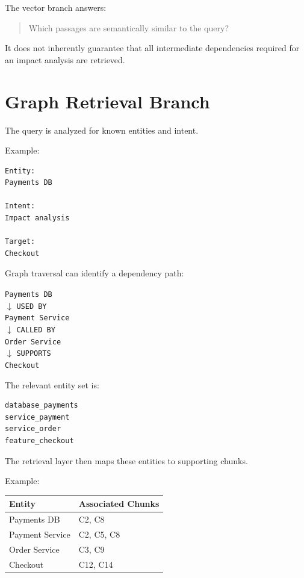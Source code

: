 \documentclass[11pt,a4paper]{article}
\begin{document}
The vector branch answers:

\begin{quote}
Which passages are semantically similar to the query?
\end{quote}

It does not inherently guarantee that all intermediate dependencies required for an impact analysis are retrieved.

\section{Graph Retrieval Branch}

The query is analyzed for known entities and intent.

Example:

\begin{lstlisting}
Entity:
Payments DB

Intent:
Impact analysis

Target:
Checkout
\end{lstlisting}

Graph traversal can identify a dependency path:

\begin{center}
\texttt{Payments DB}\\
$\downarrow$ \texttt{USED BY}\\
\texttt{Payment Service}\\
$\downarrow$ \texttt{CALLED BY}\\
\texttt{Order Service}\\
$\downarrow$ \texttt{SUPPORTS}\\
\texttt{Checkout}
\end{center}

The relevant entity set is:

\begin{lstlisting}
database_payments
service_payment
service_order
feature_checkout
\end{lstlisting}

The retrieval layer then maps these entities to supporting chunks.

Example:

\begin{center}
\begin{tabular}{ll}
\toprule
Entity & Associated Chunks \\
\midrule
Payments DB & C2, C8 \\
Payment Service & C2, C5, C8 \\
Order Service & C3, C9 \\
Checkout & C12, C14 \\
\bottomrule
\end{tabular}
\end{center}
\end{document}
